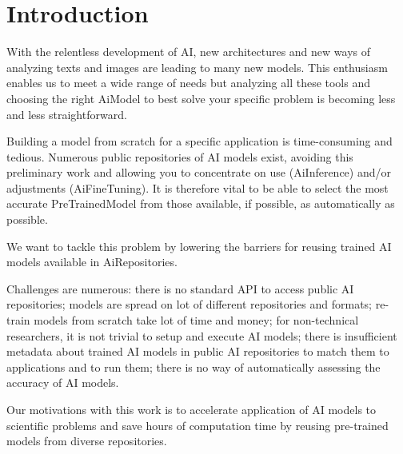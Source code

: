 \section{Introduction}
\label{sec:intro}

With the relentless development of \Gls{AI}, new
architectures and new ways of analyzing texts and images are leading to many new
models. This enthusiasm enables us to meet a wide range of needs but analyzing
all these tools and choosing the right \Gls{AiModel} to best solve your specific
problem is becoming less and less straightforward.

Building a model from scratch for a specific application is time-consuming and
tedious. Numerous public repositories of AI models exist, avoiding this
preliminary work and allowing you to concentrate on use (\Gls{AiInference}) and/or
adjustments (\Gls{AiFineTuning}). It is therefore vital to be able to select the most
accurate \Gls{PreTrainedModel} from those available, if possible, as automatically
as possible.

We want to tackle this problem by lowering the barriers for reusing trained AI
models available in \Gls{AiRepositories}.

Challenges are numerous: there is no
standard \Gls{API} to access public AI repositories; models are spread on
lot of different repositories and formats; re-train models from scratch take lot
of time and money; for non-technical researchers, it is not trivial to setup and
execute AI models; there is insufficient metadata about trained AI models in
public AI repositories to match them to applications and to run them; there
is no way of automatically assessing the accuracy of AI models.

Our motivations with this work is to accelerate application of AI models to
scientific problems and save hours of computation time by reusing pre-trained
models from diverse repositories.




